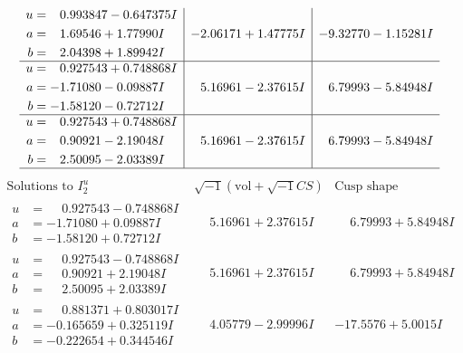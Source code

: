 \documentclass[1p]{elsarticle_modified}
\theoremstyle{definition}
\newcommand{\I}{\sqrt{-1}}
\begin{document}
$$\begin{array}{c|c|c}
\begin{aligned}
u &= \phantom{-}0.993847 - 0.647375 I \\
a &= \phantom{-}1.69546 + 1.77990 I \\
b &= \phantom{-}2.04398 + 1.89942 I\end{aligned}
 & -2.06171 + 1.47775 I & -9.32770 - 1.15281 I \\ \hline\begin{aligned}
u &= \phantom{-}0.927543 + 0.748868 I \\
a &= -1.71080 - 0.09887 I \\
b &= -1.58120 - 0.72712 I\end{aligned}
 & \phantom{-}5.16961 - 2.37615 I & \phantom{-}6.79993 - 5.84948 I \\ \hline\begin{aligned}
u &= \phantom{-}0.927543 + 0.748868 I \\
a &= \phantom{-}0.90921 - 2.19048 I \\
b &= \phantom{-}2.50095 - 2.03389 I\end{aligned}
 & \phantom{-}5.16961 - 2.37615 I & \phantom{-}6.79993 - 5.84948 I\\
 \hline 
 \end{array}$$\newpage$$\begin{array}{c|c|c}  
\text{Solutions to }I^u_{2}& \I (\text{vol} + \sqrt{-1}CS) & \text{Cusp shape}\\
 \hline 
\begin{aligned}
u &= \phantom{-}0.927543 - 0.748868 I \\
a &= -1.71080 + 0.09887 I \\
b &= -1.58120 + 0.72712 I\end{aligned}
 & \phantom{-}5.16961 + 2.37615 I & \phantom{-}6.79993 + 5.84948 I \\ \hline\begin{aligned}
u &= \phantom{-}0.927543 - 0.748868 I \\
a &= \phantom{-}0.90921 + 2.19048 I \\
b &= \phantom{-}2.50095 + 2.03389 I\end{aligned}
 & \phantom{-}5.16961 + 2.37615 I & \phantom{-}6.79993 + 5.84948 I \\ \hline\begin{aligned}
u &= \phantom{-}0.881371 + 0.803017 I \\
a &= -0.165659 + 0.325119 I \\
b &= -0.222654 + 0.344546 I\end{aligned}
 & \phantom{-}4.05779 - 2.99996 I & -17.5576 + 5.0015 I \\ \hline\begin{aligned}

\end{aligned}
\end{array}$$
\end{document}
